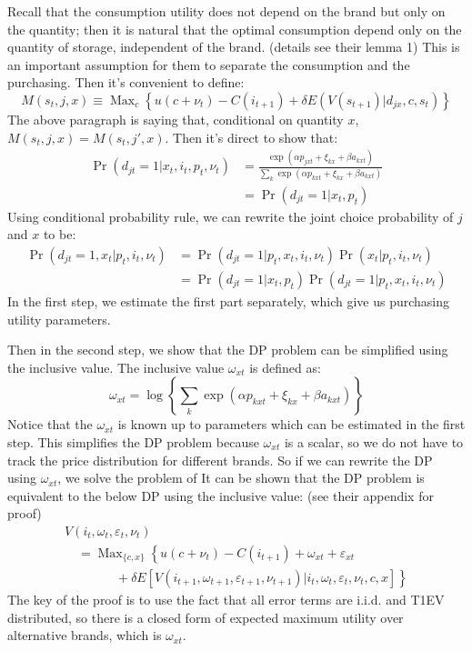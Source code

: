 Recall that the consumption utility does not depend on the brand but only on the quantity; then it is natural that the optimal consumption depend only on the quantity of storage, independent of the brand. (details see their lemma 1)
This is an important assumption for them to separate the consumption and the purchasing. 
Then it's convenient to define:
\[
    M\left(s_{t}, j, x\right)
    \equiv \operatorname{Max}_{c}\left\{u\left(c+\nu_{t}\right)-C\left(i_{t+1}\right)+\delta E\left(V\left(s_{t+1}\right) | d_{j x}, c, s_{t}\right)\right\}
\]
The above paragraph is saying that, conditional on quantity $x$, $M(s_t,j,x)=M(s_t,j',x)$.
Then it's direct to show that:
\[
  \begin{aligned} \operatorname{Pr}\left(d_{j t}=1 | x_{t}, i_{t}, p_{t}, \nu_{t}\right) &=\frac{\exp \left(\alpha p_{j x t}+\xi_{k x}+\beta a_{k x t}\right)}{\sum_{k} \exp \left(\alpha p_{k x t}+\xi_{k x}+\beta a_{k x t}\right)} \\ &=\operatorname{Pr}\left(d_{j t}=1 | x_{t}, p_{t}\right) \end{aligned}  
\]
Using conditional probability rule, we can rewrite the joint choice probability of $j$ and $x$ to be:
\begin{align*}
\operatorname{Pr}\left(d_{j t}=1, x_{t} | p_{t}, i_{t}, \nu_{t}\right)&=
\operatorname{Pr}\left(d_{j t}=1 | p_{t}, x_{t}, i_{t}, \nu_{t}\right) 
\operatorname{Pr}\left(x_{t} | p_{t}, i_{t}, \nu_{t}\right) \\
&= \operatorname{Pr}\left(d_{j t}=1 | x_{t}, p_{t}\right) 
\operatorname{Pr}\left(d_{j t}=1 | p_{t}, x_{t}, i_{t}, \nu_{t}\right) 
\end{align*}
In the first step, we estimate the first part separately, which give us purchasing utility parameters.

Then in the second step, we show that the DP problem can be simplified using the inclusive value.
The inclusive value $\omega_{xt}$ is defined as:
\[
    \omega_{x t}=\log \left\{\sum_{k} \exp \left(\alpha p_{k x t}+\xi_{k x}+\beta a_{k x t}\right)\right\}
\]
Notice that the $\omega_{xt}$ is known up to parameters which can be estimated in the first step.
This simplifies the DP problem because $\omega_{xt}$ is a scalar, so we do not have to track the price distribution for different brands.
So if we can rewrite the DP using $\omega_{xt}$, we solve the problem of 
It can be shown that the DP problem is equivalent to the below DP using the inclusive value: (see their appendix for proof)
\[
    \begin{array}{l}{V\left(i_{t}, \omega_{t}, \varepsilon_{t}, \nu_{t}\right)} \\ {\quad=\operatorname{Max}_{\{c, x\}}\left\{u\left(c+\nu_{t}\right)-C\left(i_{t+1}\right)+\omega_{x t}+\varepsilon_{x t}\right.} \\ 
    \quad \quad \quad {\left.\quad+\delta E\left[V\left(i_{t+1}, \omega_{t+1}, \varepsilon_{t+1}, \nu_{t+1}\right) | i_{t}, \omega_{t}, \varepsilon_{t}, \nu_{t}, c, x\right]\right\}}\end{array}
\]
The key of the proof is to use the fact that all error terms are i.i.d. and T1EV distributed, so there is a closed form of expected maximum utility over alternative brands, which is $\omega_{xt}$.

